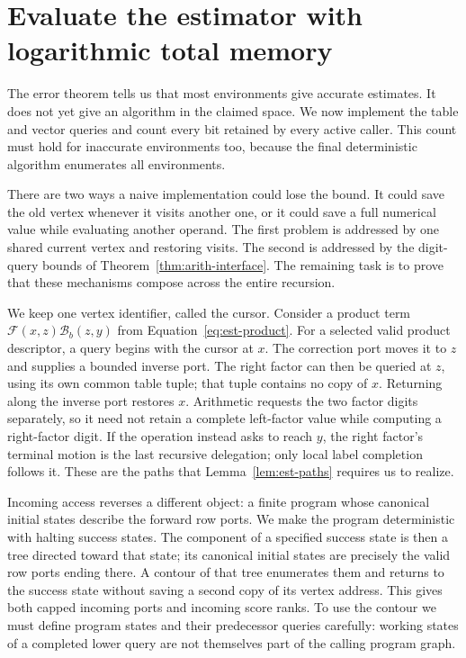 \section{Evaluate the estimator with logarithmic total memory}\label{sec:ctrl}

The error theorem tells us that most environments give accurate estimates. It does not yet give an algorithm in the claimed space. We now implement the table and vector queries and count every bit retained by every active caller. This count must hold for inaccurate environments too, because the final deterministic algorithm enumerates all environments.

There are two ways a naive implementation could lose the bound. It could save the old vertex whenever it visits another one, or it could save a full numerical value while evaluating another operand. The first problem is addressed by one shared current vertex and restoring visits. The second is addressed by the digit-query bounds of Theorem~\ref{thm:arith-interface}. The remaining task is to prove that these mechanisms compose across the entire recursion.

We keep one vertex identifier, called the cursor.  Consider a product term
$\mathcal F(x,z)\mathcal B_b(z,y)$ from
Equation~\eqref{eq:est-product}.  For a selected valid product descriptor, a query begins with the cursor
at $x$.
The correction port moves it to $z$ and supplies a bounded inverse port.
The right factor can then be queried at $z$, using its own common table
tuple; that tuple contains no copy of $x$.  Returning along the inverse
port restores $x$.  Arithmetic requests the two factor digits separately,
so it need not retain a complete left-factor value while computing a
right-factor digit.  If the operation instead asks to reach $y$, the
right factor's terminal motion is the last recursive delegation; only
local label completion follows it.  These are the paths that
Lemma~\ref{lem:est-paths} requires us to realize.

Incoming access reverses a different object: a finite program whose
canonical initial states describe the forward row ports.  We make the
program deterministic with halting success states.  The component of a
specified success state is then a tree directed toward that state; its
canonical initial states are precisely the valid row ports ending there.  A contour of that tree enumerates them and returns to
the success state without saving a second copy of its vertex address.  This gives both
capped incoming ports and incoming score ranks.  To use the contour we
must define program states and their predecessor queries carefully:
working states of a completed lower query are not themselves part of
the calling program graph.

